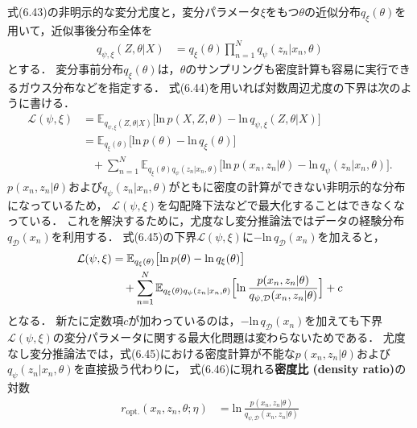 \documentclass[11pt,a4paper]{jsarticle}
\numberwithin{equation}{section}
\begin{document}
式(6.43)の非明示的な変分尤度と，変分パラメータ$\xi$をもつ$\theta$の近似分布$q_\xi (\theta)$を用いて，近似事後分布全体を
\begin{align}
q_{\psi, \xi} (Z, \theta | X)
& =
q_\xi (\theta) \prod_{n=1}^N q_\psi (z_n | x_n, \theta)
\end{align}
とする．
変分事前分布$q_\xi (\theta)$は，$\theta$のサンプリングも密度計算も容易に実行できるガウス分布などを指定する．
式(6.44)を用いれば対数周辺尤度の下界は次のように書ける．
\begin{align}
\mathcal{L}(\psi, \xi)
& =
\mathbb{E}_{q_{\psi, \xi} (Z, \theta | X)} \bigl[ \mathrm{ln} \, p(X, Z, \theta) - \mathrm{ln} \, q_{\psi, \xi} (Z, \theta | X) \bigr] \nonumber \\
& =
\mathbb{E}_{q_\xi (\theta)} \bigl[ \mathrm{ln} \, p(\theta) - \mathrm{ln} \, q_\xi (\theta) \bigr] \nonumber \\
& \hspace{10pt}
+ \sum_{n=1}^N \mathbb{E}_{q_\xi (\theta) q_{\psi} (z_n | x_n, \theta)} \bigl[ \mathrm{ln} \, p(x_n, z_n | \theta) - \mathrm{ln} \, q_{\psi} (z_n | x_n, \theta) \bigr].
\end{align}
$p(x_n, z_n | \theta)$および$q_{\psi} (z_n | x_n, \theta)$がともに密度の計算ができない非明示的な分布になっているため，
$\mathcal{L}(\psi, \xi)$を勾配降下法などで最大化することはできなくなっている．
これを解決するために，尤度なし変分推論法ではデータの経験分布$q_\mathcal{D} (x_n)$を利用する．
式(6.45)の下界$\mathcal{L}(\psi, \xi)$に$-\mathrm{ln} \, q_\mathcal{D} (x_n)$を加えると，
\begin{align}
\mathcal{L}(\psi, \xi)
& =
\mathbb{E}_{q_\xi (\theta)} \bigl[ \mathrm{ln} \, p(\theta) - \mathrm{ln} \, q_\xi (\theta) \bigr] \nonumber \\
& \hspace{10pt}
+ \sum_{n=1}^N \mathbb{E}_{q_\xi (\theta) q_{\psi} (z_n | x_n, \theta)} \Bigl[ \mathrm{ln} \, \frac{p(x_n, z_n | \theta)}{q_{\psi, \mathcal{D}} (x_n, z_n | \theta)} \Bigr] + c
\end{align}
となる．
新たに定数項$c$が加わっているのは，$-\mathrm{ln} \, q_\mathcal{D} (x_n)$を加えても下界$\mathcal{L}(\psi, \xi)$の変分パラメータに関する最大化問題は変わらないためである．
尤度なし変分推論法では，式(6.45)における密度計算が不能な$p(x_n, z_n | \theta)$および$q_{\psi} (z_n | x_n, \theta)$を直接扱う代わりに，
式(6.46)に現れる\textbf{密度比 (density ratio)}の対数
\begin{align}
r_{\mathrm{opt.}} (x_n, z_n, \theta; \eta)
& =
\mathrm{ln} \, \frac{p(x_n, z_n | \theta)}{q_{\psi, \mathcal{D}} (x_n, z_n | \theta)}
\end{align}
\end{document}
